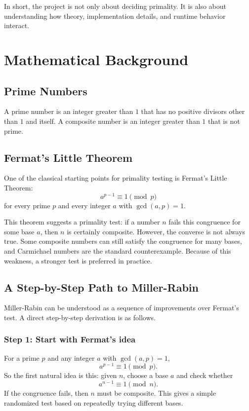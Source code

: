 \documentclass[12pt,a4paper]{report}
\begin{document}
In short, the project is not only about deciding primality. It is also about understanding how theory, implementation details, and runtime behavior interact.

\chapter{Mathematical Background}
\section{Prime Numbers}
A prime number is an integer greater than \(1\) that has no positive divisors other than \(1\) and itself. A composite number is an integer greater than \(1\) that is not prime.

\section{Fermat's Little Theorem}
One of the classical starting points for primality testing is Fermat's Little Theorem:
\[
a^{p-1} \equiv 1 \pmod{p}
\]
for every prime \(p\) and every integer \(a\) with \(\gcd(a,p)=1\).

This theorem suggests a primality test: if a number \(n\) fails this congruence for some base \(a\), then \(n\) is certainly composite. However, the converse is not always true. Some composite numbers can still satisfy the congruence for many bases, and Carmichael numbers are the standard counterexample. Because of this weakness, a stronger test is preferred in practice.

\section{A Step-by-Step Path to Miller-Rabin}
Miller-Rabin can be understood as a sequence of improvements over Fermat's test. A direct step-by-step derivation is as follows.

\subsection{Step 1: Start with Fermat's idea}
For a prime \(p\) and any integer \(a\) with \(\gcd(a,p)=1\),
\[
a^{p-1} \equiv 1 \pmod{p}.
\]
So the first natural idea is this: given \(n\), choose a base \(a\) and check whether
\[
a^{n-1} \equiv 1 \pmod{n}.
\]
If the congruence fails, then \(n\) must be composite. This gives a simple randomized test based on repeatedly trying different bases.
\end{document}
